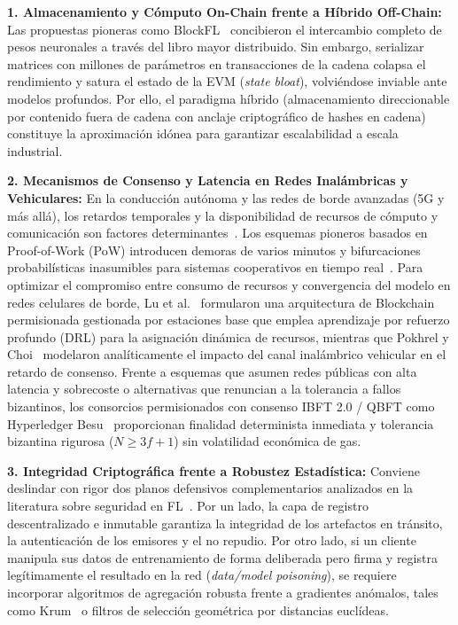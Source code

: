 \textbf{1. Almacenamiento y Cómputo On-Chain frente a Híbrido Off-Chain:} Las propuestas pioneras como BlockFL~\cite{kim2019blockfl} concibieron el intercambio completo de pesos neuronales a través del libro mayor distribuido. Sin embargo, serializar matrices con millones de parámetros en transacciones de la cadena colapsa el rendimiento y satura el estado de la EVM (\textit{state bloat}), volviéndose inviable ante modelos profundos. Por ello, el paradigma híbrido (almacenamiento direccionable por contenido fuera de cadena con anclaje criptográfico de hashes en cadena) constituye la aproximación idónea para garantizar escalabilidad a escala industrial.

\textbf{2. Mecanismos de Consenso y Latencia en Redes Inalámbricas y Vehiculares:} En la conducción autónoma y las redes de borde avanzadas (5G y más allá), los retardos temporales y la disponibilidad de recursos de cómputo y comunicación son factores determinantes~\cite{pokhrel2020federated, lu2020blockchain}. Los esquemas pioneros basados en Proof-of-Work (PoW) introducen demoras de varios minutos y bifurcaciones probabilísticas inasumibles para sistemas cooperativos en tiempo real~\cite{kim2019blockfl}. Para optimizar el compromiso entre consumo de recursos y convergencia del modelo en redes celulares de borde, Lu et al.~\cite{lu2020blockchain} formularon una arquitectura de Blockchain permisionada gestionada por estaciones base que emplea aprendizaje por refuerzo profundo (DRL) para la asignación dinámica de recursos, mientras que Pokhrel y Choi~\cite{pokhrel2020federated} modelaron analíticamente el impacto del canal inalámbrico vehicular en el retardo de consenso. Frente a esquemas que asumen redes públicas con alta latencia y sobrecoste o alternativas que renuncian a la tolerancia a fallos bizantinos, los consorcios permisionados con consenso IBFT 2.0 / QBFT como Hyperledger Besu~\cite{pujol2024blockchain} proporcionan finalidad determinista inmediata y tolerancia bizantina rigurosa ($N \ge 3f + 1$) sin volatilidad económica de gas.

\textbf{3. Integridad Criptográfica frente a Robustez Estadística:} Conviene deslindar con rigor dos planos defensivos complementarios analizados en la literatura sobre seguridad en FL~\cite{bouacida2021vulnerabilities, jere2021taxonomy}. Por un lado, la capa de registro descentralizado e inmutable garantiza la integridad de los artefactos en tránsito, la autenticación de los emisores y el no repudio. Por otro lado, si un cliente manipula sus datos de entrenamiento de forma deliberada pero firma y registra legítimamente el resultado en la red (\textit{data/model poisoning}), se requiere incorporar algoritmos de agregación robusta frente a gradientes anómalos, tales como Krum~\cite{blanchard2017byzantine} o filtros de selección geométrica por distancias euclídeas.

